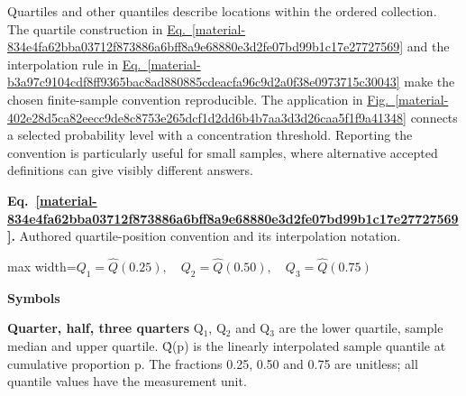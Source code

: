 \documentclass[11pt,a4paper]{article}
\begin{document}
Quartiles and other quantiles describe locations within the ordered collection. The quartile construction in \hyperref[material-834e4fa62bba03712f873886a6bff8a9e68880e3d2fe07bd99b1c17e27727569]{Eq.~\ref*{material-834e4fa62bba03712f873886a6bff8a9e68880e3d2fe07bd99b1c17e27727569}} and the interpolation rule in \hyperref[material-b3a97c9104cdf8ff9365bac8ad880885cdeacfa96c9d2a0f38e0973715c30043]{Eq.~\ref*{material-b3a97c9104cdf8ff9365bac8ad880885cdeacfa96c9d2a0f38e0973715c30043}} make the chosen finite-sample convention reproducible. The application in \hyperref[material-402e28d5ca82eecc9de8c8753e265dcf1d2dd6b4b7aa3d3d26caa5f1f9a41348]{Fig.~\ref*{material-402e28d5ca82eecc9de8c8753e265dcf1d2dd6b4b7aa3d3d26caa5f1f9a41348}} connects a selected probability level with a concentration threshold. Reporting the convention is particularly useful for small samples, where alternative accepted definitions can give visibly different answers.


\par\medskip
\noindent\begin{minipage}{\linewidth}
\label{material-834e4fa62bba03712f873886a6bff8a9e68880e3d2fe07bd99b1c17e27727569}
\noindent\textbf{Eq.~\ref*{material-834e4fa62bba03712f873886a6bff8a9e68880e3d2fe07bd99b1c17e27727569}.} Authored quartile-position convention and its interpolation notation.\par\nopagebreak
\begin{center}\begin{adjustbox}{max width=\linewidth}$\displaystyle Q_1=\widehat Q(0.25),\quad Q_2=\widehat Q(0.50),\quad Q_3=\widehat Q(0.75)$\end{adjustbox}\end{center}

\par\noindent\textbf{Symbols}

\par\noindent\textbf{Quarter, half, three quarters} Q\ensuremath{{}_1}, Q\ensuremath{{}_2} and Q\ensuremath{{}_3} are the lower quartile, sample median and upper quartile. Q̂(p) is the linearly interpolated sample quantile at cumulative proportion p. The fractions 0.25, 0.50 and 0.75 are unitless; all quantile values have the measurement unit.

\end{minipage}\par
\medskip
\end{document}
